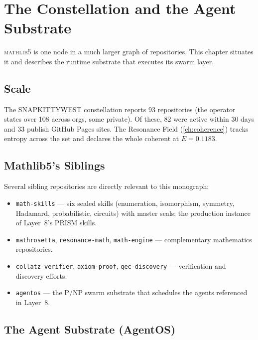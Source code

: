 \chapter{The Constellation and the Agent Substrate}
\label{ch:constellation}

\textsc{mathlib5} is one node in a much larger graph of repositories. This
chapter situates it and describes the runtime substrate that executes its
swarm layer.

\section{Scale}
\label{sec:con-scale}

The SNAPKITTYWEST constellation reports 93 repositories (the operator states
over 108 across orgs, some private). Of these, 82 were active within 30 days
and 33 publish GitHub Pages sites. The Resonance Field (\cref{ch:coherence})
tracks entropy across the set and declares the whole coherent at
$E = 0.1183$.

\section{Mathlib5's Siblings}
\label{sec:con-siblings}

Several sibling repositories are directly relevant to this monograph:
\begin{itemize}
  \item \texttt{math-skills} --- six sealed skills (enumeration, isomorphism,
        symmetry, Hadamard, probabilistic, circuits) with master seals; the
        production instance of Layer~8's PRISM skills.
  \item \texttt{mathrosetta}, \texttt{resonance-math}, \texttt{math-engine}
        --- complementary mathematics repositories.
  \item \texttt{collatz-verifier}, \texttt{axiom-proof}, \texttt{qec-discovery}
        --- verification and discovery efforts.
  \item \texttt{agentos} --- the P/NP swarm substrate that schedules the
        agents referenced in Layer~8.
\end{itemize}

\section{The Agent Substrate (AgentOS)}
\label{sec:con-agentos}

